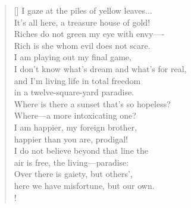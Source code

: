 \documentclass[]{article}
\begin{document}
\settowidth{\versewidth}{I gaze at the piles of yellow leaves...   }
\begin{verse}[\versewidth]
I gaze at the piles of yellow leaves...\\
It's all here, a treasure house of gold!\\
Riches do not green my eye with envy—-\\
Rich is she whom evil does not scare.\\
I am playing out my final game,\\
I don't know what's dream and what's for real,\\
and I'm living life in total freedom\\
in a twelve-square-yard paradise.\\
Where is there a sunset that's so hopeless?\\
Where—a more intoxicating one?\\
I am happier, my foreign brother,\\
happier than you are, prodigal!\\
I do not believe beyond that line the\\
air is free, the living—paradise:\\
Over there is gaiety, but others',\\
here we have misfortune, but our own.\\!
\end{verse}
\newpage 
\end{document}
